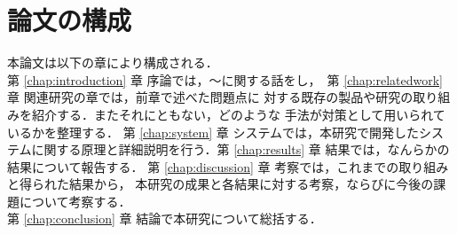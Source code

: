 \section{論文の構成}
本論文は以下の章により構成される．\\

第 \ref{chap:introduction} 章 序論では，〜に関する話をし，\
第 \ref{chap:relatedwork} 章 関連研究の章では，前章で述べた問題点に
対する既存の製品や研究の取り組みを紹介する．またそれにともない，どのような
手法が対策として用いられているかを整理する．
第 \ref{chap:system} 章 システムでは，本研究で開発したシステムに関する原理と詳細説明を行う．第 \ref{chap:results} 章 結果では，なんらかの結果について報告する．
第 \ref{chap:discussion} 章 考察では，これまでの取り組みと得られた結果から，
本研究の成果と各結果に対する考察，ならびに今後の課題について考察する．\\
第 \ref{chap:conclusion} 章 結論で本研究について総括する．\\

\newpage

